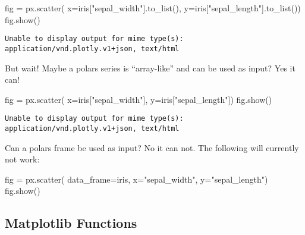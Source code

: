 \documentclass[
  letterpaper,
  DIV=11,
  numbers=noendperiod]{scrartcl}
\newenvironment{Shaded}{\begin{snugshade}}{\end{snugshade}}
\newcommand{\NormalTok}[1]{\textcolor[rgb]{0.00,0.23,0.31}{#1}}
\newcommand{\OperatorTok}[1]{\textcolor[rgb]{0.37,0.37,0.37}{#1}}
\newcommand{\StringTok}[1]{\textcolor[rgb]{0.13,0.47,0.30}{#1}}
\begin{document}
\begin{Shaded}
\begin{Highlighting}[]
\NormalTok{fig }\OperatorTok{=}\NormalTok{ px.scatter(}
\NormalTok{    x}\OperatorTok{=}\NormalTok{iris[}\StringTok{"sepal\_width"}\NormalTok{].to\_list(), }
\NormalTok{    y}\OperatorTok{=}\NormalTok{iris[}\StringTok{"sepal\_length"}\NormalTok{].to\_list())}
\NormalTok{fig.show()}
\end{Highlighting}
\end{Shaded}

\begin{verbatim}
Unable to display output for mime type(s): application/vnd.plotly.v1+json, text/html
\end{verbatim}

But wait! Maybe a polars series is ``array-like'' and can be used as
input? Yes it can!

\begin{Shaded}
\begin{Highlighting}[]
\NormalTok{fig }\OperatorTok{=}\NormalTok{ px.scatter(}
\NormalTok{    x}\OperatorTok{=}\NormalTok{iris[}\StringTok{"sepal\_width"}\NormalTok{], }
\NormalTok{    y}\OperatorTok{=}\NormalTok{iris[}\StringTok{"sepal\_length"}\NormalTok{])}
\NormalTok{fig.show()}
\end{Highlighting}
\end{Shaded}

\begin{verbatim}
Unable to display output for mime type(s): application/vnd.plotly.v1+json, text/html
\end{verbatim}

Can a polars frame be used as input? No it can not. The following will
currently not work:

\begin{Shaded}
\begin{Highlighting}[]
\NormalTok{fig }\OperatorTok{=}\NormalTok{ px.scatter(}
\NormalTok{    data\_frame}\OperatorTok{=}\NormalTok{iris,}
\NormalTok{    x}\OperatorTok{=}\StringTok{"sepal\_width"}\NormalTok{,}
\NormalTok{    y}\OperatorTok{=}\StringTok{"sepal\_length"}\NormalTok{)}
\NormalTok{fig.show()}
\end{Highlighting}
\end{Shaded}

\hypertarget{matplotlib-functions}{%
\subsection{Matplotlib Functions}\label{matplotlib-functions}}
\end{document}

